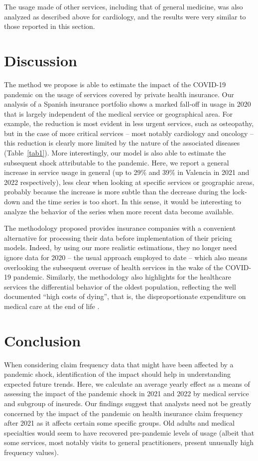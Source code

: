 \documentclass[]{risa}
\begin{document}
The usage made of other services, including that of general medicine, was also analyzed as described above for cardiology, and the results were very similar to those reported in this section.


\section{Discussion}\label{discussion}
The method we propose is able to estimate the impact of the COVID-19 pandemic on the usage of services covered by private health insurance. Our analysis of a Spanish insurance portfolio shows a marked fall-off in usage in 2020 that is largely independent of the medical service or geographical area. For example, the reduction is most evident in less urgent services, such as osteopathy, but in the case of more critical services – most notably cardiology and oncology – this reduction is clearly more limited by the nature of the associated diseases (Table~\ref{tab1}). More interestingly, our model is also able to estimate the subsequent shock attributable to the pandemic. Here, we report a general increase in service usage in general (up to 29\% and 39\% in Valencia in 2021 and 2022 respectively), less clear when looking at specific services or geographic areas, probably because the increase is more subtle than the decrease during the lock-down and the time series is too short. In this sense, it would be interesting to analyze the behavior of the series when more recent data become available. 

The methodology proposed provides insurance companies with a convenient alternative for processing their data before implementation of their pricing models. Indeed, by using our more realistic estimations, they no longer need ignore data for 2020 – the usual approach employed to date – which also means overlooking the subsequent overuse of health services in the wake of the COVID-19 pandemic. Similarly, the methodology also highlights for the healthcare services the differential behavior of the oldest population, reflecting the well documented ``high costs of dying'', that is, the disproportionate expenditure on medical care at the end of life \cite{lubitz_use_1984, scitovsky_high_2005}. 

\section{Conclusion}
When considering claim frequency data that might have been affected by a pandemic shock, identification of the impact should help in understanding expected future trends. Here, we calculate an average yearly effect as a means of assessing the impact of the pandemic shock in 2021 and 2022 by medical service and subgroup of insureds. Our findings suggest that analysts need not be greatly concerned by the impact of the pandemic on health insurance claim frequency after 2021 as it affects certain some specific groups. Old adults and medical specialties would seem to have recovered pre-pandemic levels of usage (albeit that some services, most notably visits to general practitioners, present unusually high frequency values). 
\end{document}
